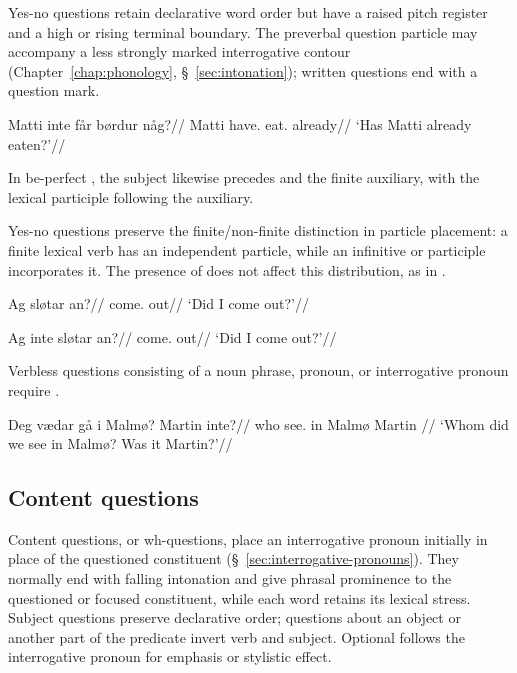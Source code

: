 Yes-no questions retain declarative word order but have a raised pitch register and a high or rising terminal boundary. The preverbal question particle  may accompany a less strongly marked interrogative contour (Chapter~\ref{chap:phonology}, \S~\ref{sec:intonation}); written questions end with a question mark.

\pex
\begingl
\gla Matti inte får børdur någ?//
\glb Matti \Q{} have.\Pres{} eat.\PstP{} already//
\glft `Has Matti already eaten?'//
\endgl
\xe

In be-perfect , the subject likewise precedes  and the finite auxiliary, with the lexical participle following the auxiliary.

Yes-no questions preserve the finite/non-finite distinction in particle placement: a finite lexical verb has an independent particle, while an infinitive or participle incorporates it. The presence of  does not affect this distribution, as in .

\pex
\begingl
\gla Ag sløtar an?//
\glb \First{}\Sg{} come.\Pst{} out//
\glft `Did I come out?'//
\endgl
\xe

\pex
\begingl
\gla Ag inte sløtar an?//
\glb \First{}\Sg{} \Q{} come.\Pst{} out//
\glft `Did I come out?'//
\endgl
\xe

Verbless questions consisting of a noun phrase, pronoun, or interrogative pronoun require .

\pex
\begingl
\gla Deg vædar gå i Malmø? Martin inte?//
\glb who see.\Pst{} \First{}\Pl{} in Malmø Martin \Q{}//
\glft `Whom did we see in Malmø? Was it Martin?'//
\endgl
\xe


\subsection{Content questions}
\label{sec:content-questions}

Content questions, or wh-questions, place an interrogative pronoun initially in place of the questioned constituent (\S~\ref{sec:interrogative-pronouns}). They normally end with falling intonation and give phrasal prominence to the questioned or focused constituent, while each word retains its lexical stress. Subject questions preserve declarative order; questions about an object or another part of the predicate invert verb and subject. Optional  follows the interrogative pronoun for emphasis or stylistic effect.

